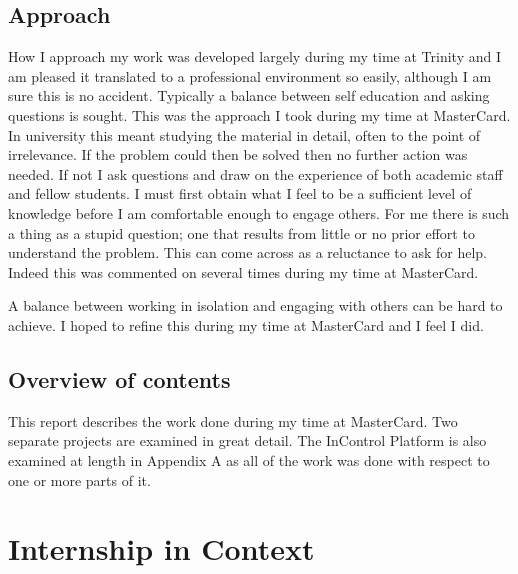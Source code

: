 \documentclass[a4paper, 11pt, titlepage]{article}
\begin{document}
\subsection{Approach} 

How I approach my work was developed largely during my time at Trinity and I am pleased it translated to a professional environment so easily, although I am sure this is no accident. Typically a balance between self education and asking questions is sought. This was the approach I took during my time at MasterCard. In university this meant studying the material in detail, often to the point of irrelevance. If the problem could then be solved then no further action was needed. If not I ask questions and draw on the experience of both academic staff and fellow students. I must first obtain what I feel to be a sufficient level of knowledge before I am comfortable enough to engage others. For me there is such a thing as a stupid question; one that results from little or no prior effort to understand the problem. This can come across as a reluctance to ask for help. Indeed this was commented on several times during my time at MasterCard.

A balance between working in isolation and engaging with others can be hard to achieve. I hoped to refine this during my time at MasterCard and I feel I did.

 
\subsection{Overview of contents}

This report describes the work done during my time at MasterCard. Two separate projects are examined in great detail. The InControl Platform is also examined at length in Appendix A as all of the work was done with respect to one or more parts of it.
 
\section{Internship in Context} 
\end{document}
